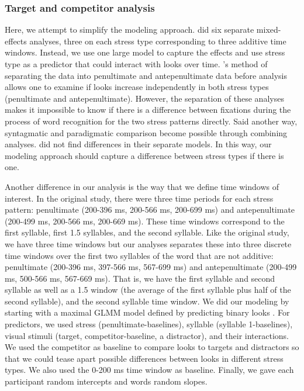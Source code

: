 \subsubsection{Target and competitor analysis}
Here, we attempt to simplify the modeling approach. \cite{Sulpizio_McQueen_2012} did six separate mixed-effects analyses, three on each stress type corresponding to three additive time windows. Instead, we use one large model to capture the effects and use stress type as a predictor that could interact with looks over time. \cite{Sulpizio_McQueen_2012}'s method of separating the data into penultimate and antepenultimate data before analysis allows one to examine if looks increase independently in both stress types (penultimate and antepenultimate). However, the separation of these analyses makes it impossible to know if there is a difference between fixations during the process of word recognition for the two stress patterns directly. Said another way, syntagmatic and paradigmatic comparison become possible through combining analyses. \cite{Sulpizio_McQueen_2012} did not find differences in their separate models. In this way, our modeling approach should capture a difference between stress types if there is one. 

Another difference in our analysis is the way that we define time windows of interest. In the original study, there were three time periods for each stress pattern: penultimate (200-396 ms, 200-566 ms, 200-699 ms) and antepenultimate (200-499 ms, 200-566 ms, 200-669 ms). These time windows correspond to the first syllable, first 1.5 syllables, and the second syllable. Like the original study, we have three time windows but our analyses separates these into three discrete time windows over the first two syllables of the word that are not additive: penultimate (200-396 ms, 397-566 ms, 567-699 ms) and antepenultimate (200-499 ms, 500-566 ms, 567-669 ms). That is, we have the first syllable and second syllable as well as a 1.5 window (the average of the first syllable plus half of the second syllable), and the second syllable time window. We did our modeling by starting with a maximal GLMM model defined by predicting binary looks \citep{Barr_2008}. For predictors, we used stress (penultimate-baselines), syllable (syllable 1-baselines), visual stimuli (target, competitor-baseline, a distractor), and their interactions. We used the competitor as baseline to compare looks to targets and distractors so that we could tease apart possible differences between looks in different stress types. We also used the 0-200 ms time window as baseline. Finally, we gave each participant random intercepts and words random slopes.

